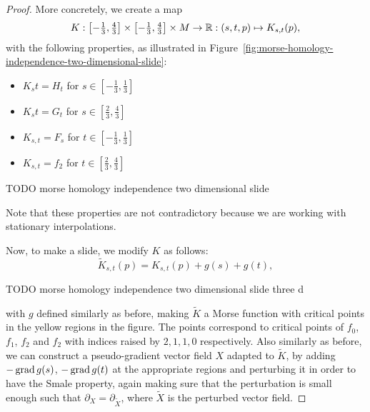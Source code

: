 \begin{proof}
More concretely, we create a map
\[
    K: \left[-\tfrac{1}{3}, \tfrac{4}{3}\right] \times \left[-\tfrac{1}{3}, \tfrac{4}{3}\right] \times M \to  \mathbb{R}:  (s, t, p) \mapsto K_{s, t}(p)
,\] 
with the following properties, as illustrated in Figure~\ref{fig:morse-homology-independence-two-dimensional-slide}:
\begin{itemize}
    \item $K_st = H_t$ for  $s \in \left[-\tfrac{1}{3}, \tfrac{1}{3}\right]$
        \item $K_st = G_t$ for  $s \in \left[\tfrac{2}{3}, \tfrac{4}{3}\right]$
        \item $K_{s, t} = F_s$ for $t \in \left[-\tfrac{1}{3}, \tfrac{1}{3}\right]$ 
        \item $K_{s,t} = f_2$ for $t \in \left[\tfrac{2}{3}, \tfrac{4}{3}\right]$
\end{itemize}
\begin{marginfigure}
    \centering
    \caption{TODO morse homology independence two dimensional slide}
    \label{fig:morse-homology-independence-two-dimensional-slide}
\end{marginfigure}
Note that these properties are not contradictory because we are working with stationary interpolations.

Now, to make a slide, we modify $K$ as follows:
 \[
     \tilde{K}_{s,t}(p) = K_{s,t}(p) + g(s) + g(t)
,\] 

\begin{marginfigure}
    \centering
    \caption{TODO morse homology independence two dimensional slide three d}
    \label{fig:morse-homology-independence-two-dimensional-slide-three-d}
\end{marginfigure}

with $g$ defined similarly as before, making $\tilde{K}$ a Morse function with critical points in the yellow regions in the figure.
The points correspond to critical points of $f_0$, $f_1$, $f_2$ and $f_2$ with indices raised by $2, 1, 1, 0$ respectively.
Also similarly as before, we can construct a pseudo-gradient vector field $X$ adapted to $\tilde{K}$, by adding $-\operatorname{grad} g(s)$, $-\operatorname{grad} g(t)$ at the appropriate regions and perturbing it in order to have the Smale property, again making sure that the perturbation is small enough such that $\partial_X = \partial_{\tilde X}$, where $\tilde{X}$ is the perturbed vector field.


\end{proof}
